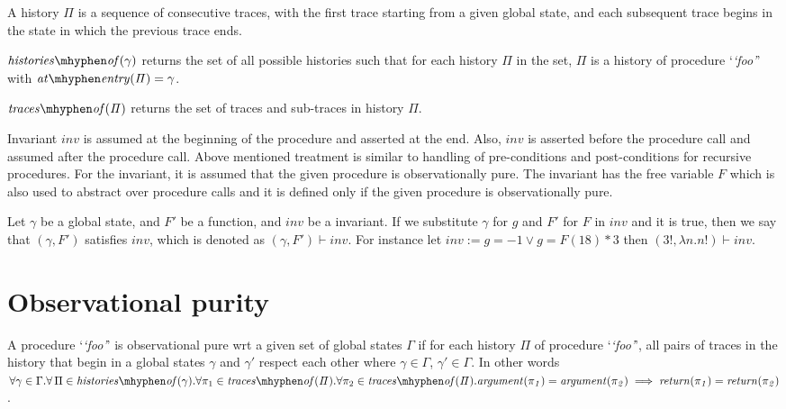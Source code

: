 \documentclass{llncs}
\newcommand{\foo}{\textit{`foo'}}
\newcommand{\trace}{\pi}
\newcommand{\inv}{\mathit{inv}}
\newcommand{\history}{\Pi}
\newcommand{\F}{\mathit{F}}
\newcommand{\gstate}{\gamma}
\newcommand{\satisfies}{\vdash}
\newcommand{\atEntry}[1]{\mathit{at \mhyphen entry(#1)}}
\newcommand{\return}[1]{\mathit{return(#1)}}
\newcommand{\param}[1]{\mathit{argument(#1)}}
\newcommand{\Gstates}{\Gamma}
\newcommand{\historyOf}[1]{\mathit{histories \mhyphen of(#1)}}
\newcommand{\tracesOf}[1]{\mathit{traces \mhyphen of(#1)}}
\begin{document}
\begin{definition}[history]
  A history $\history$ is a sequence of consecutive traces, with the
  first trace starting from a given global state, and each subsequent
  trace begins in the state in which the previous trace ends.
\end{definition}

\begin{definition} 
  $\historyOf{\gstate}$ returns the set of all possible histories such
  that for each history $\history$ in the set, $\history$ is a history
  of procedure `\foo' with $\atEntry{\history} = \gstate$.
\end{definition}

\begin{definition} $\tracesOf{\history}$ returns the set of traces and
  sub-traces in history $\history$.
\end{definition}

Invariant $\inv$ is assumed at the beginning of the procedure and
asserted at the end. Also, $\inv$ is asserted before the procedure
call and assumed after the procedure call. Above mentioned treatment
is similar to handling of pre-conditions and post-conditions for
recursive procedures. For the invariant, it is assumed that the given
procedure is observationally pure. The invariant has the free variable
$\F$ which is also used to abstract over procedure calls and it is
defined only if the given procedure is observationally pure.

Let $\gstate$ be a global state, and $\F'$ be a function, and $\inv$
be a invariant. If we substitute $\gstate$ for $g$ and $\F'$ for $\F$
in $\inv$ and it is true, then we say that $(\gstate, \F')$ satisfies
$\inv$, which is denoted as $(\gstate, \F') \satisfies \inv$. For
instance let $\inv := g = -1 \vee g = \F(18) * 3$ then $(3!, \lambda
n. n!) \satisfies \inv$.

\section{Observational purity}\label{sec:op}

\begin{definition}
  A procedure `\foo' is observational pure wrt a given set of global
states $\Gstates$ if for each history $\history$ of procedure `\foo',
all pairs of traces in the history that begin in a global states
$\gstate$ and $\gstate'$ respect each other where
$\gstate \in 
 \Gstates$, $\gstate' \in \Gstates$.  In other words $\forall \gstate
\in \Gstates.\forall \, \history \in \historyOf{\gstate}. \forall
\trace_1 \in \tracesOf{\history}. \forall \trace_2 \in
\tracesOf{\history}. \param{\trace_1} = \param{\trace_2} \implies
\return{\trace_1} = \return{\trace_2}$.
\end{definition}
\end{document}
